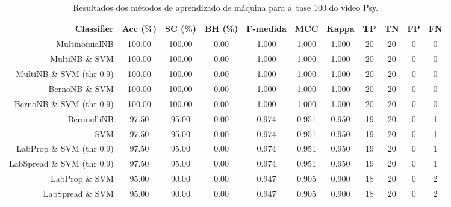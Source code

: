 \begin{table}[!htb]
\centering
\caption{Resultados dos métodos de aprendizado de máquina para a base 100 do vídeo Psy.}
\label{tab:Psy-100}
\begin{tabular}{r|c|c|c|c|c|c|c|c|c|c}
\hline\hline
Classifier & Acc (\%) & SC (\%) & BH (\%) & F-medida & MCC & Kappa & TP & TN & FP & FN \\ \hline
MultinomialNB & 100.00 & 100.00 & 0.00 & 1.000 & 1.000 & 1.000 & 20 & 20 & 0 & 0 \\ 
MultiNB \& SVM & 100.00 & 100.00 & 0.00 & 1.000 & 1.000 & 1.000 & 20 & 20 & 0 & 0 \\ 
MultiNB \& SVM (thr 0.9) & 100.00 & 100.00 & 0.00 & 1.000 & 1.000 & 1.000 & 20 & 20 & 0 & 0 \\ 
BernoNB \& SVM & 100.00 & 100.00 & 0.00 & 1.000 & 1.000 & 1.000 & 20 & 20 & 0 & 0 \\ 
BernoNB \& SVM (thr 0.9) & 100.00 & 100.00 & 0.00 & 1.000 & 1.000 & 1.000 & 20 & 20 & 0 & 0 \\ 
BernoulliNB & 97.50 & 95.00 & 0.00 & 0.974 & 0.951 & 0.950 & 19 & 20 & 0 & 1 \\ 
SVM & 97.50 & 95.00 & 0.00 & 0.974 & 0.951 & 0.950 & 19 & 20 & 0 & 1 \\ 
LabProp \& SVM (thr 0.9) & 97.50 & 95.00 & 0.00 & 0.974 & 0.951 & 0.950 & 19 & 20 & 0 & 1 \\ 
LabSpread \& SVM (thr 0.9) & 97.50 & 95.00 & 0.00 & 0.974 & 0.951 & 0.950 & 19 & 20 & 0 & 1 \\ 
LabProp \& SVM & 95.00 & 90.00 & 0.00 & 0.947 & 0.905 & 0.900 & 18 & 20 & 0 & 2 \\ 
LabSpread \& SVM & 95.00 & 90.00 & 0.00 & 0.947 & 0.905 & 0.900 & 18 & 20 & 0 & 2 \\ 
\hline\hline
\end{tabular}
\end{table}
